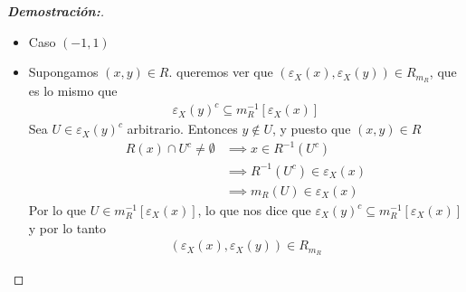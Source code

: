 \documentclass[12pt]{book}
\begin{document}
\begin{proof}[{\textbf{Demostración:}}]
\begin{itemize}
\begin{itemize}
\item[$\Leftarrow$)] Sea $(\varepsilon_X(x), \varepsilon_X(y))\in R_{m_R}$, queremos ver que $(x,y)\in R$. Probaremos la contrarrecíproca. Supongamos que \((x,y)\notin R\). Por la condición de separación de la definición de $(i,j)$‑relación, existe un $U\in \mathcal{D}(X)$ tal que $y\in U$ y $R(x)\cap U =\emptyset$. Esto implica que 
\begin{align*}
    U\in \varepsilon_X(y)\quad \text{ y }\quad x\notin R^{-1}(U)=m_R(U)
\end{align*}
Así $m_R(U)\notin \varepsilon_X(x)$ y por lo tanto $U\notin m_R^{-1}[\varepsilon_X(x)]$, pero sí $U\in \varepsilon_X(y)$. De esta manera $\varepsilon_X(y)\nsubseteq m_R^{-1}[\varepsilon_X(x)]$ por lo que 
\begin{align*}
    (\varepsilon_X(x), \varepsilon_X(y))\notin R_{m_R}
\end{align*}
\end{itemize}
\item Caso $(-1,1)$

\item[$\Rightarrow$)] Supongamos $(x,y)\in R$. 
queremos ver que $(\varepsilon_X(x), \varepsilon_X(y))\in R_{m_R}$, que es lo mismo que 
\begin{align*}
    \varepsilon_X(y)^c\subseteq m_R^{-1}[\varepsilon_X(x)]
\end{align*}
Sea $U\in \varepsilon_X(y)^c$ arbitrario. Entonces $y\notin U$, y puesto que $(x,y)\in R$
\begin{align*}
    R(x)\cap U^c\neq\emptyset &\implies x\in R^{-1}(U^c)\\
    &\implies R^{-1}(U^c)\in \varepsilon_X(x)\\
    &\implies m_R(U)\in \varepsilon_X(x)
\end{align*}
Por lo que $U\in m_R^{-1}[\varepsilon_X(x)]$, lo que nos dice que $\varepsilon_X(y)^c\subseteq m_R^{-1}[\varepsilon_X(x)]$ y por lo tanto
\begin{align*}
    (\varepsilon_X(x), \varepsilon_X(y))\in R_{m_R}
\end{align*}


\end{itemize}
\end{proof}
\end{document}
